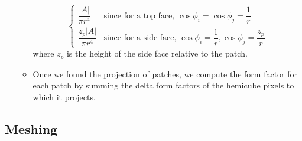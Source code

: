 \documentclass[twocolumn,landscape,10pt]{article}
\theoremstyle{definition}
\begin{document}
\begin{itemize}
\begin{itemize}
\[                    \begin{cases}
                        \dfrac{|A|}{\pi r^4} & \text{since for a top face, }
                        \cos{\phi_i}=\cos{\phi_j}=\dfrac{1}{r} \\[8px]
                        \dfrac{z_p|A|}{\pi r^4} & \text{since for a side face, }
                        \cos{\phi_i}=\dfrac{1}{r}, \cos{\phi_j}=\dfrac{z_p}{r}
                    \end{cases}  
                \]
                where $z_p$ is the height of the side face relative to the
                patch.
            \item Once we found the projection of patches, we compute the form
                factor for each patch by summing the delta form factors of the
                hemicube pixels to which it projects.
        \end{itemize} 
\end{itemize} 

\subsection{Meshing}
\end{document}
